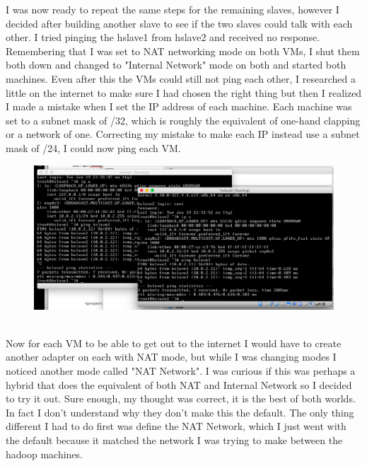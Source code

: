 \documentclass[10pt]{article}
\begin{document}
\par
I was now ready to repeat the same steps for the remaining slaves, however I decided after building another slave to see if the two slaves could talk with each other. I tried pinging the hslave1 from hslave2 and received no response. Remembering that I was set to NAT networking mode on both VMs, I shut them both down and changed to "Internal Network" mode on both and started both machines. Even after this the VMs could still not ping each other, I researched a little on the internet to make sure I had chosen the right thing but then I realized I made a mistake when I set the IP address of each machine. Each machine was set to a subnet mask of /32, which is roughly the equivalent of one-hand clapping or a network of one. Correcting my mistake to make each IP instead use a subnet mask of /24, I could now ping each VM.
\begin{figure}[!h]
\includegraphics[scale=0.37]{success_ping.png}
\centering
\end{figure}\\
\indent Now for each VM to be able to get out to the internet I would have to create another adapter on each with NAT mode, but while I was changing modes I noticed another mode called "NAT Network". I was curious if this was perhaps a hybrid that does the equivalent of both NAT and Internal Network so I decided to try it out. Sure enough, my thought was correct, it is the best of both worlds. In fact I don't understand why they don't make this the default. The only thing different I had to do first was define the NAT Network, which I just went with the default because it matched the network I was trying to make between the hadoop machines. 
\end{document}
